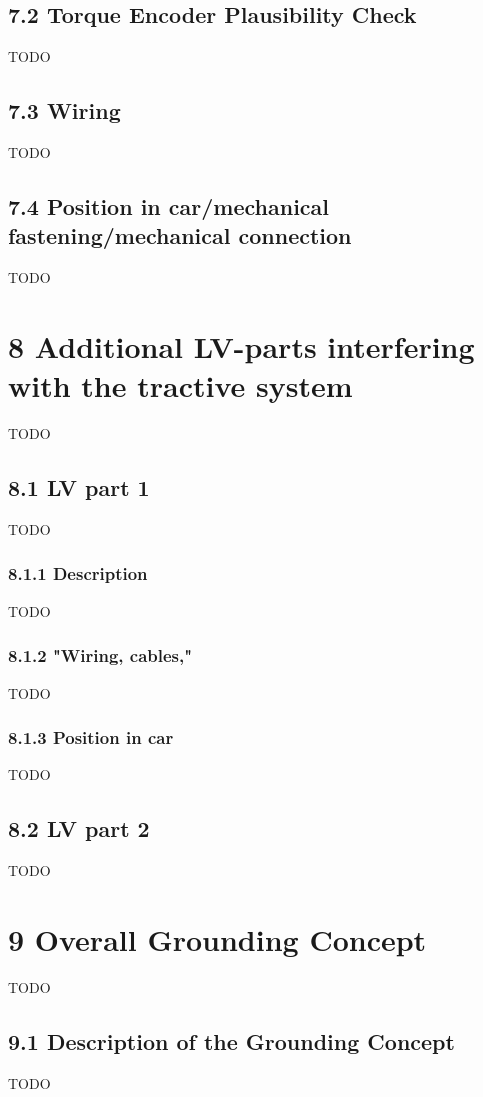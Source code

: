 \documentclass{article}
\begin{document}
\subsection*{7.2 Torque Encoder Plausibility Check}
TODO

\subsection*{7.3 Wiring}
TODO

\subsection*{7.4 Position in car/mechanical fastening/mechanical connection}
TODO

\section*{8 Additional LV-parts interfering with the tractive system}
TODO

\subsection*{8.1 LV part 1}
TODO

\subsubsection*{8.1.1 Description}
TODO

\subsubsection*{8.1.2 "Wiring, cables,"}
TODO

\subsubsection*{8.1.3 Position in car}
TODO

\subsection*{8.2 LV part 2}
TODO

\section*{9 Overall Grounding Concept}
TODO

\subsection*{9.1 Description of the Grounding Concept}
TODO
\end{document}
